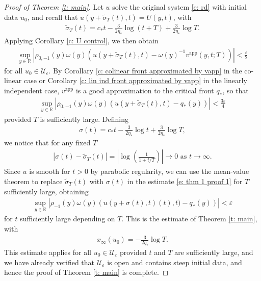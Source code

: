 \documentclass[11pt]{article}
\newcommand{\eps}{\varepsilon}
\newcommand{\R}{\mathbb{R}}
\numberwithin{equation}{section}
\numberwithin{prop}{section}
\begin{document}
\begin{proof}[Proof of Theorem \ref{t: main}]
	Let $u$ solve the original system \eqref{e: rd} with initial data $u_0$, and recall that $u(y+\tilde{\sigma}_T (t), t) = U(y,t)$, with 
	\begin{align}
	\tilde{\sigma}_T (t) = c_* t - \frac{3}{2 \eta_*} \log (t+T) + \frac{3}{2 \eta_*} \log T. 
	\end{align}
	Applying Corollary \ref{c: U control}, we then obtain
	\begin{align}
	\sup_{y \in \R} \left| \rho_{0,-1} (y) \omega (y) \left( u(y+\tilde{\sigma}_T (t), t) - \omega(y)^{-1} v^\mathrm{app}(y, t; T) \right)\right| < \frac{\eps}{2} 
	\end{align}
	for all $u_0 \in \mathcal{U}_\eps$. By Corollary \ref{c: colinear front approximated by vapp} in the co-linear case or Corollary \ref{c: lin ind front approximated by vapp} in the linearly independent case, $v^\mathrm{app}$ is a good approximation to the critical front $q_*$, so that
	\begin{align}
	\sup_{y \in \R} \left| \rho_{0,-1} (y) \omega (y) \left( u(y+\tilde{\sigma}_T (t), t) - q_*(y)\right)\right| < \frac{3 \eps}{4} \label{e: thm 1 proof 1}
	\end{align}
	provided $T$ is sufficiently large. Defining
	\begin{align}
	\sigma(t) = c_* t - \frac{3}{2 \eta_*} \log t + \frac{3}{2 \eta_*} \log T,
	\end{align}
	we notice that for any fixed $T$
	\begin{align}
	\left| \sigma(t) - \tilde{\sigma}_T (t) \right| = \left| \log \left( \frac{1}{1+ t/T} \right) \right| \to 0 \text{ as } t \to \infty. 
	\end{align}
	Since $u$ is smooth for $t > 0$ by parabolic regularity, we can use the mean-value theorem to replace $\tilde{\sigma}_T(t)$ with $\sigma(t)$ in the estimate \eqref{e: thm 1 proof 1} for $T$ sufficiently large, obtaining
	\begin{align}
	\sup_{y \in \R} \left| \rho_{-1} (y) \omega (y) \left( u(y+\sigma(t), t) (t), t) - q_*(y)\right)\right| < \eps
	\end{align}
	for $t$ sufficiently large depending on $T$.  This is the estimate of Theorem \ref{t: main}, with 
	\begin{align}
	x_\infty (u_0) = - \frac{3}{2 \eta_*} \log T. 
	\end{align}
	This estimate applies for all $u_0 \in \mathcal{U}_\eps$ provided $t$ and $T$ are sufficiently large, and we have already verified that $\mathcal{U}_\eps$ is open and contains steep initial data, and hence the proof of Theorem \ref{t: main} is complete. 
\end{proof}
\end{document}
